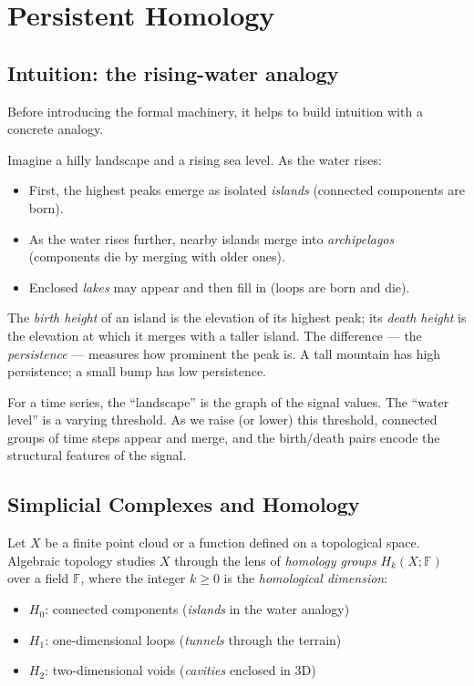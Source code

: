 \documentclass[12pt, a4paper]{article}
\theoremstyle{definition}
\theoremstyle{plain}
\begin{document}
\section{Persistent Homology}
\label{sec:persistent_homology}

\subsection{Intuition: the rising-water analogy}

Before introducing the formal machinery, it helps to build intuition with a
concrete analogy.

Imagine a hilly landscape and a rising sea level. As the water rises:
\begin{itemize}[nosep]
  \item First, the highest peaks emerge as isolated \emph{islands} (connected
    components are born).
  \item As the water rises further, nearby islands merge into \emph{archipelagos}
    (components die by merging with older ones).
  \item Enclosed \emph{lakes} may appear and then fill in (loops are born and die).
\end{itemize}
The \emph{birth height} of an island is the elevation of its highest peak; its
\emph{death height} is the elevation at which it merges with a taller island.
The difference — the \emph{persistence} — measures how prominent the peak is.
A tall mountain has high persistence; a small bump has low persistence.

For a time series, the ``landscape'' is the graph of the signal values. The
``water level'' is a varying threshold. As we raise (or lower) this threshold,
connected groups of time steps appear and merge, and the birth/death pairs encode
the structural features of the signal.

\subsection{Simplicial Complexes and Homology}

Let $X$ be a finite point cloud or a function defined on a topological space.
Algebraic topology studies $X$ through the lens of \emph{homology groups}
$H_k(X; \mathbb{F})$ over a field $\mathbb{F}$, where the integer $k \geq 0$
is the \emph{homological dimension}:

\begin{itemize}[nosep]
  \item $H_0$: connected components (\emph{islands} in the water analogy)
  \item $H_1$: one-dimensional loops (\emph{tunnels} through the terrain)
  \item $H_2$: two-dimensional voids (\emph{cavities} enclosed in 3D)
\end{itemize}
\end{document}
